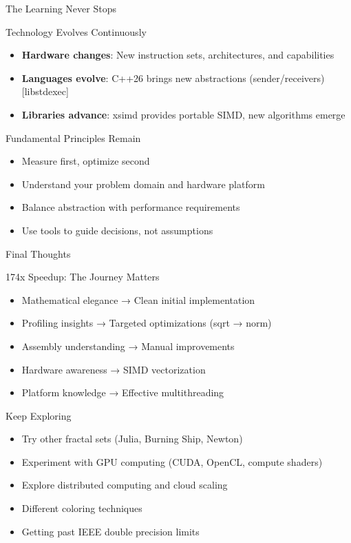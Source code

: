 \documentclass{beamer}
\begin{document}
\begin{frame}{The Learning Never Stops}
    \begin{block}{Technology Evolves Continuously}
        \begin{itemize}
            \item \textbf{Hardware changes}: New instruction sets, architectures, and capabilities
            \item \textbf{Languages evolve}: C++26 brings new abstractions (sender/receivers) [libstdexec]
            \item \textbf{Libraries advance}: xsimd provides portable SIMD, new algorithms emerge
        \end{itemize}
    \end{block}
    
    \begin{block}{Fundamental Principles Remain}
        \begin{itemize}
            \item Measure first, optimize second
            \item Understand your problem domain and hardware platform
            \item Balance abstraction with performance requirements
            \item Use tools to guide decisions, not assumptions
        \end{itemize}
    \end{block}
\end{frame}

\begin{frame}{Final Thoughts}
    \begin{exampleblock}{174x Speedup: The Journey Matters}
        \begin{itemize}
            \item Mathematical elegance → Clean initial implementation
            \item Profiling insights → Targeted optimizations (sqrt → norm)
            \item Assembly understanding → Manual improvements
            \item Hardware awareness → SIMD vectorization
            \item Platform knowledge → Effective multithreading
        \end{itemize}
    \end{exampleblock}
    
    \begin{block}{Keep Exploring}
        \begin{itemize}
            \item Try other fractal sets (Julia, Burning Ship, Newton)
            \item Experiment with GPU computing (CUDA, OpenCL, compute shaders)
            \item Explore distributed computing and cloud scaling
            \item Different coloring techniques
            \item Getting past IEEE double precision limits
        \end{itemize}
    \end{block}
\end{frame}
\end{document}
